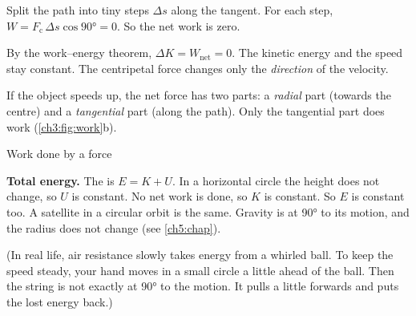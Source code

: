 Split the path into tiny steps $\Delta s$ along the tangent. For each step,
$W = F_\mathrm{c}\,\Delta s\cos\ang{90} = 0$. So the net work is zero.

By the work--energy theorem, $\Delta K = W_\mathrm{net} = 0$. The kinetic energy and the speed stay
constant. The centripetal force changes only the \emph{direction} of the velocity.

If the object speeds up, the net force has two parts: a \emph{radial} part (towards the
centre) and a \emph{tangential} part (along the path). Only the tangential part does work
(\cref{ch3:fig:work}b).

\begin{formulacard}{Work done by a force}
  \begin{symbols}
  \end{symbols}
\end{formulacard}

\textbf{Total energy.} The  is $E = K + U$. In a horizontal circle
the height does not change, so $U$ is constant. No net work is done, so $K$ is constant. So $E$
is constant too. A satellite in a circular orbit is the same. Gravity is at \ang{90} to its
motion, and the radius does not change (see \cref{ch5:chap}).

(In real life, air resistance slowly takes energy from a whirled ball. To keep the speed steady,
your hand moves in a small circle a little ahead of the ball. Then the string is not exactly at
\ang{90} to the motion. It pulls a little forwards and puts the lost energy back.)

